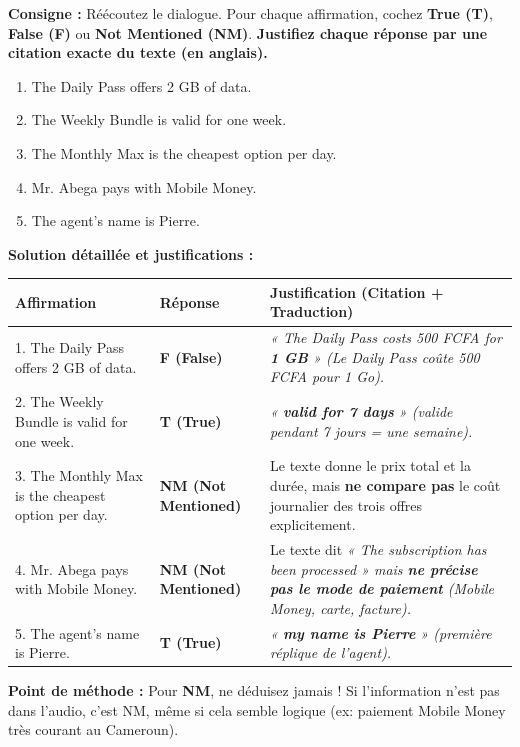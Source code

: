 \documentclass[11pt]{article}
\newcommand{\eng}[1]{\ifmmode\text{\textit{#1}}\else\begingroup\selectlanguage{english}\itshape #1\endgroup\fi}
\begin{document}
\begin{exoresolu}
\textbf{Consigne :} Réécoutez le dialogue. Pour chaque affirmation, cochez \textbf{True (T)}, \textbf{False (F)} ou \textbf{Not Mentioned (NM)}. \textbf{Justifiez chaque réponse par une citation exacte du texte (en anglais).}

\begin{enumerate}
    \item The Daily Pass offers 2 GB of data.
    \item The Weekly Bundle is valid for one week.
    \item The Monthly Max is the cheapest option per day.
    \item Mr. Abega pays with Mobile Money.
    \item The agent's name is Pierre.
\end{enumerate}

\tcblower
\textbf{Solution détaillée et justifications :}

\begin{center}
\begin{tabularx}{\linewidth}{|X|X|X|}
\hline
\rowcolor{popblueL} \textbf{Affirmation} & \textbf{Réponse} & \textbf{Justification (Citation + Traduction)} \\
\hline
1. The Daily Pass offers 2 GB of data. & \textbf{F (False)} & \eng{« The Daily Pass costs 500 FCFA for \textbf{1 GB} »} (Le Daily Pass coûte 500 FCFA pour 1 Go). \\
\hline
2. The Weekly Bundle is valid for one week. & \textbf{T (True)} & \eng{« \textbf{valid for 7 days} »} (valide pendant 7 jours = une semaine). \\
\hline
3. The Monthly Max is the cheapest option per day. & \textbf{NM (Not Mentioned)} & Le texte donne le prix total et la durée, mais \textbf{ne compare pas} le coût journalier des trois offres explicitement. \\
\hline
4. Mr. Abega pays with Mobile Money. & \textbf{NM (Not Mentioned)} & Le texte dit \eng{« The subscription has been processed »} mais \textbf{ne précise pas le mode de paiement} (Mobile Money, carte, facture). \\
\hline
5. The agent's name is Pierre. & \textbf{T (True)} & \eng{« \textbf{my name is Pierre} »} (première réplique de l'agent). \\
\hline
\end{tabularx}
\end{center}

\textbf{Point de méthode :} Pour \textbf{NM}, ne déduisez jamais ! Si l'information n'est pas dans l'audio, c'est NM, même si cela semble logique (ex: paiement Mobile Money très courant au Cameroun).
\end{exoresolu}
\end{document}
